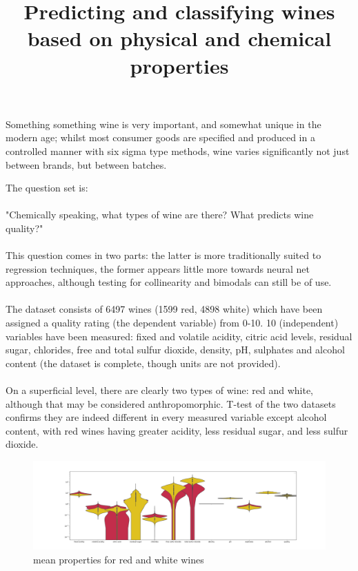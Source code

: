 \documentclass{article}
\begin{document}
\title{Predicting and classifying wines based on physical and chemical properties}
\maketitle
\begin{flushleft}
Something something wine is very important, and somewhat unique in the modern age; whilst most consumer goods are 
specified and produced in a controlled manner with six sigma type methods, wine varies significantly not just between brands, 
but between batches. 
\end{flushleft}
The question set is:
\\~\\
"Chemically speaking, what types of wine are there? What predicts wine quality?"
\\~\\
This question comes in two parts: the latter is more traditionally suited to regression techniques, 
the former appears little more towards neural net approaches, although testing for collinearity and bimodals
can still be of use.
\\~\\
The dataset consists of 6497 wines (1599 red, 4898 white) which have been assigned a quality rating (the dependent variable) from 0-10.  
10 (independent) variables have been measured: fixed and volatile acidity, citric acid levels, residual sugar, chlorides, free and total sulfur dioxide,
density, pH, sulphates and alcohol content (the dataset is complete, though units are not provided). 
\\~\\
On a superficial level, there are clearly two types of wine: red and white, although that may be considered anthropomorphic.  T-test of the two datasets
confirms they are indeed different in every measured variable except alcohol content, with red wines having greater acidity, less residual sugar, and less sulfur dioxide.

\begin{figure}[h]
\includegraphics[width=\linewidth]{figures/red_white_properties_log_axis.png}
\caption{mean properties for red and white wines}
\label{fig:means}
\end{figure}
\end{document}
